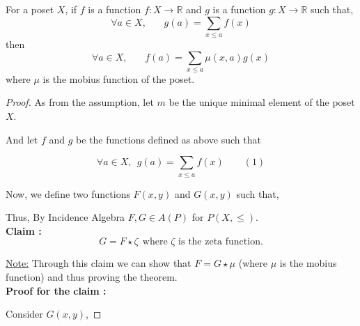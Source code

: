 \begin{theorem}

For a poset $X$, if $f$ is a function $f: X \rightarrow \mathbb{R}$ and $g$ is a function $g: X \rightarrow \mathbb{R}$ such that,
$$\forall a \in X, ~~~~~~~~g(a) = \sum_{x \le a} f(x)$$ 
then
$$\boxed{\forall a \in X, ~~~~~~~~f(a) = \sum_{x \le a} \mu(x,a) g(x)}$$
where $\mu$ is the mobius function of the poset.
\end{theorem}

\begin{proof}

As from the assumption, let $m$ be the unique minimal element of the poset $X$.

\noindent And let $f$ and $g$ be the functions defined as above such that 

$$\forall a \in X, ~~g(a) = \sum\limits_{x \le a} f(x)  ~~~~~~~~~(1)$$

\noindent Now, we define two functions $F(x,y)$ and $G(x,y)$ such that,

\begin{Parallel}[v]{0.48\textwidth}{0.48\textwidth}
  \ParallelPar
\end{Parallel}

\noindent Thus, By Incidence Algebra $F,G \in A(P)$ for $P(X,\le)$.\\

\noindent \textbf{Claim :}
$$\boxed{G = F \star \zeta ~~\textrm{where $\zeta$ is the zeta function.}}$$

\noindent \underline{Note:} Through this claim we can show that $F = G \star \mu$ (where $\mu$ is the mobius function) and thus proving the theorem.\\


\noindent \textbf{Proof for the claim :}

\noindent Consider $G(x,y)$,


\end{proof}
